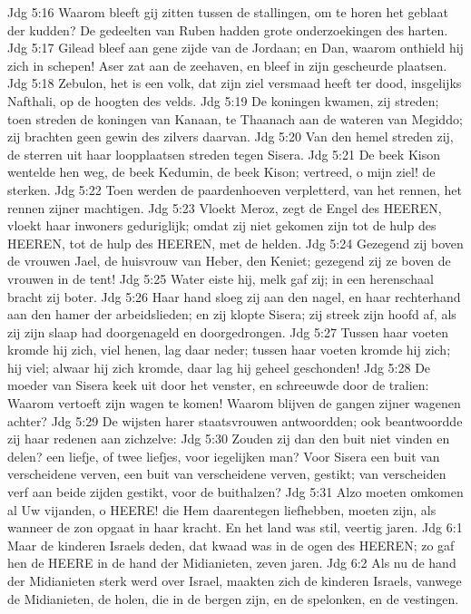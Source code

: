 Jdg 5:16  Waarom bleeft gij zitten tussen de stallingen, om te horen het geblaat der kudden? De gedeelten van Ruben hadden grote onderzoekingen des harten.
Jdg 5:17  Gilead bleef aan gene zijde van de Jordaan; en Dan, waarom onthield hij zich in schepen! Aser zat aan de zeehaven, en bleef in zijn gescheurde plaatsen.
Jdg 5:18  Zebulon, het is een volk, dat zijn ziel versmaad heeft ter dood, insgelijks Nafthali, op de hoogten des velds.
Jdg 5:19  De koningen kwamen, zij streden; toen streden de koningen van Kanaan, te Thaanach aan de wateren van Megiddo; zij brachten geen gewin des zilvers daarvan.
Jdg 5:20  Van den hemel streden zij, de sterren uit haar loopplaatsen streden tegen Sisera.
Jdg 5:21  De beek Kison wentelde hen weg, de beek Kedumin, de beek Kison; vertreed, o mijn ziel! de sterken.
Jdg 5:22  Toen werden de paardenhoeven verpletterd, van het rennen, het rennen zijner machtigen.
Jdg 5:23  Vloekt Meroz, zegt de Engel des HEEREN, vloekt haar inwoners geduriglijk; omdat zij niet gekomen zijn tot de hulp des HEEREN, tot de hulp des HEEREN, met de helden.
Jdg 5:24  Gezegend zij boven de vrouwen Jael, de huisvrouw van Heber, den Keniet; gezegend zij ze boven de vrouwen in de tent!
Jdg 5:25  Water eiste hij, melk gaf zij; in een herenschaal bracht zij boter.
Jdg 5:26  Haar hand sloeg zij aan den nagel, en haar rechterhand aan den hamer der arbeidslieden; en zij klopte Sisera; zij streek zijn hoofd af, als zij zijn slaap had doorgenageld en doorgedrongen.
Jdg 5:27  Tussen haar voeten kromde hij zich, viel henen, lag daar neder; tussen haar voeten kromde hij zich; hij viel; alwaar hij zich kromde, daar lag hij geheel geschonden!
Jdg 5:28  De moeder van Sisera keek uit door het venster, en schreeuwde door de tralien: Waarom vertoeft zijn wagen te komen! Waarom blijven de gangen zijner wagenen achter?
Jdg 5:29  De wijsten harer staatsvrouwen antwoordden; ook beantwoordde zij haar redenen aan zichzelve:
Jdg 5:30  Zouden zij dan den buit niet vinden en delen? een liefje, of twee liefjes, voor iegelijken man? Voor Sisera een buit van verscheidene verven, een buit van verscheidene verven, gestikt; van verscheiden verf aan beide zijden gestikt, voor de buithalzen?
Jdg 5:31  Alzo moeten omkomen al Uw vijanden, o HEERE! die Hem daarentegen liefhebben, moeten zijn, als wanneer de zon opgaat in haar kracht. En het land was stil, veertig jaren.
Jdg 6:1  Maar de kinderen Israels deden, dat kwaad was in de ogen des HEEREN; zo gaf hen de HEERE in de hand der Midianieten, zeven jaren.
Jdg 6:2  Als nu de hand der Midianieten sterk werd over Israel, maakten zich de kinderen Israels, vanwege de Midianieten, de holen, die in de bergen zijn, en de spelonken, en de vestingen.
